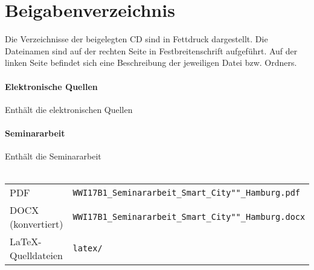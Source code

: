 \section*{Beigabenverzeichnis} 

Die Verzeichnisse der beigelegten CD sind in Fettdruck dargestellt.
Die Dateinamen sind auf der rechten Seite in Festbreitenschrift aufgeführt.
Auf der linken Seite befindet sich eine Beschreibung der jeweiligen Datei bzw. Ordners.

\paragraph{Elektronische Quellen} Enthält die elektronischen Quellen \\

\paragraph{Seminararbeit} Enthält die Seminararbeit \\\\
\begin{tabular}{>{\raggedleft\arraybackslash}p{4cm}p{8cm}}
	                PDF & \texttt{WWI17B1\_Seminararbeit\_Smart\_City""\_Hamburg.pdf}  \\
	 DOCX (konvertiert) & \texttt{WWI17B1\_Seminararbeit\_Smart\_City""\_Hamburg.docx} \\
	\LaTeX -Quelldateien & \texttt{latex/}
\end{tabular}